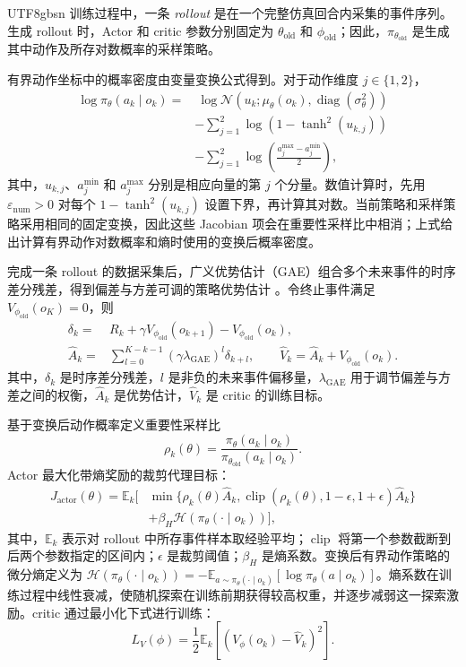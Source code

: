 \documentclass[conference]{IEEEtran}
\begin{document}
\begin{CJK*}{UTF8}{gbsn}
训练过程中，一条 \emph{rollout} 是在一个完整仿真回合内采集的事件序列。生成 rollout 时，Actor 和 critic 参数分别固定为 $\theta_{\mathrm{old}}$ 和 $\phi_{\mathrm{old}}$；因此，$\pi_{\theta_{\mathrm{old}}}$ 是生成其中动作及所存对数概率的采样策略。

有界动作坐标中的概率密度由变量变换公式得到。对于动作维度 $j\in\{1,2\}$，
\begin{align}
 \log\pi_\theta(a_k\mid o_k)
 =&\ \log\mathcal{N}\!\left(u_k;\mu_\theta(o_k),
 \operatorname{diag}(\sigma_\theta^2)\right) \nonumber\\
 &-\sum_{j=1}^{2}\log\!\left(1-\tanh^2(u_{k,j})\right) \nonumber\\
 &-\sum_{j=1}^{2}\log\!\left(\frac{a_j^{\max}-a_j^{\min}}{2}\right),
\end{align}
其中，$u_{k,j}$、$a_j^{\min}$ 和 $a_j^{\max}$ 分别是相应向量的第 $j$ 个分量。数值计算时，先用 $\varepsilon_{\mathrm{num}}>0$ 对每个 $1-\tanh^2(u_{k,j})$ 设置下界，再计算其对数。当前策略和采样策略采用相同的固定变换，因此这些 Jacobian 项会在重要性采样比中相消；上式给出计算有界动作对数概率和熵时使用的变换后概率密度。

完成一条 rollout 的数据采集后，广义优势估计（GAE）组合多个未来事件的时序差分残差，得到偏差与方差可调的策略优势估计 \cite{schulman2015gae}。令终止事件满足 $V_{\phi_{\mathrm{old}}}(o_K)=0$，则
\begin{align}
 \delta_k={}&R_k+\gamma V_{\phi_{\mathrm{old}}}(o_{k+1})
 -V_{\phi_{\mathrm{old}}}(o_k),\\
 \widehat{A}_k={}&\sum_{l=0}^{K-k-1}
 (\gamma\lambda_{\mathrm{GAE}})^l\delta_{k+l},\qquad
 \widehat{V}_k=\widehat{A}_k+V_{\phi_{\mathrm{old}}}(o_k).
\end{align}
其中，$\delta_k$ 是时序差分残差，$l$ 是非负的未来事件偏移量，$\lambda_{\mathrm{GAE}}$ 用于调节偏差与方差之间的权衡，$\widehat{A}_k$ 是优势估计，$\widehat{V}_k$ 是 critic 的训练目标。

基于变换后动作概率定义重要性采样比
\begin{equation}
 \rho_k(\theta)=
 \frac{\pi_\theta(a_k\mid o_k)}
 {\pi_{\theta_{\mathrm{old}}}(a_k\mid o_k)}.
\end{equation}
Actor 最大化带熵奖励的裁剪代理目标：
\begin{align}
 J_{\mathrm{actor}}(\theta)=\mathbb{E}_k\big[&
 \min\{\rho_k(\theta)\widehat{A}_k,
 \operatorname{clip}(\rho_k(\theta),1-\epsilon,1+\epsilon)
 \widehat{A}_k\}\nonumber\\
 &+\beta_H\mathcal{H}(\pi_\theta(\cdot\mid o_k))\big],
\end{align}
其中，$\mathbb{E}_k$ 表示对 rollout 中所存事件样本取经验平均；$\operatorname{clip}$ 将第一个参数截断到后两个参数指定的区间内；$\epsilon$ 是裁剪阈值；$\beta_H$ 是熵系数。变换后有界动作策略的微分熵定义为 $\mathcal{H}(\pi_\theta(\cdot\mid o_k))=-\mathbb{E}_{a\sim\pi_\theta(\cdot\mid o_k)}[\log\pi_\theta(a\mid o_k)]$。熵系数在训练过程中线性衰减，使随机探索在训练前期获得较高权重，并逐步减弱这一探索激励。critic 通过最小化下式进行训练：
\begin{equation}
 L_V(\phi)=\frac{1}{2}\mathbb{E}_k
 \left[\left(V_\phi(o_k)-\widehat{V}_k\right)^2\right].
\end{equation}


\end{CJK*}
\end{document}
